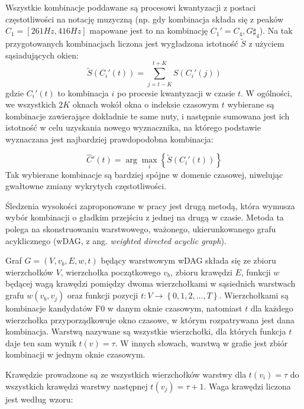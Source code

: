 \documentclass[12pt,a4paper,twoside]{mwart}
\begin{document}
Wszystkie kombinacje poddawane są procesowi kwantyzacji z postaci częstotliwości na notację muzyczną (np. gdy kombinacja składa się z peaków $C_1 = [261 Hz, 416 Hz]$ mapowane jest to na kombinację $C_1' = {C_4, G\sharp_4}$). Na tak przygotowanych kombinacjach liczona jest wygładzona istotność $\widetilde{S}$ z użyciem sąsiadujących okien:
\begin{equation} \label{eq:inharmonicity2:smoothedSalience}
  \widetilde{S}(C_i'(t)) = \sum_{j = t - K}^{t+K}S(C_i'(j))
\end{equation}
gdzie $C_i'(t)$ to kombinacja $i$ po procesie kwantyzacji w czasie $t$. W ogólności, we wszystkich $2K$ oknach wokół okna o indeksie czasowym $t$ wybierane są kombinacje zawierające dokładnie te same nuty, i następnie sumowana jest ich istotność w celu uzyskania nowego wyznacznika, na którego podstawie wyznaczana jest najbardziej prawdopodobna kombinacja:

\begin{equation} \label{eq:inharmonicity2:smoothedSalience:winner}
\widehat{C}'(t) = \arg \max_i \left\{\widetilde{S}(C_i'(t))\right\}
\end{equation}
Tak wybierane kombinacje są bardziej spójne w domenie czasowej, niwelując gwałtowne zmiany wykrytych częstotliwości.

Śledzenia wysokości zaproponowane w pracy \cite[7-8]{Transcription:Pertus:Inharmonicity2} jest drugą metodą, która wymusza wybór kombinacji o gładkim przejściu z jednej na drugą w czasie. Metoda ta polega na skonstruowaniu warstwowego, ważonego, ukierunkowanego grafu acyklicznego (wDAG, z ang. \textit{weighted directed acyclic graph}).

Graf $G = \left(V, v_b, E, w, t\right)$ będący warstwowym wDAG składa się ze zbioru wierzchołków $V$, wierzchołka początkowego $v_b$, zbioru krawędzi $E$, funkcji $w$ będącej wagą krawędzi pomiędzy dwoma wierzchołkami w sąsiednich warstwach grafu $w(v_b, v_j)$ oraz funkcji pozycji $t: V \rightarrow \left\{0, 1, 2, ..., T\right\}$. Wierzchołkami są kombinacje kandydatów F0 w danym oknie czasowym, natomiast $t$ dla każdego wierzchołka przyporządkowuje okno czasowe, w którym rozpatrywana jest dana kombinacja. Warstwą nazywane są wszystkie wierzchołki, dla których funkcja $t$ daje ten sam wynik $t(v) = \tau$. W innych słowach, warstwą w grafie jest zbiór kombinacji w jednym oknie czasowym.

Krawędzie prowadzone są ze wszystkich wierzchołków warstwy dla $t(v_i) = \tau$ do wszystkich krawędzi warstwy następnej $t(v_j) = \tau + 1$. Waga krawędzi liczona jest według wzoru:
\end{document}
